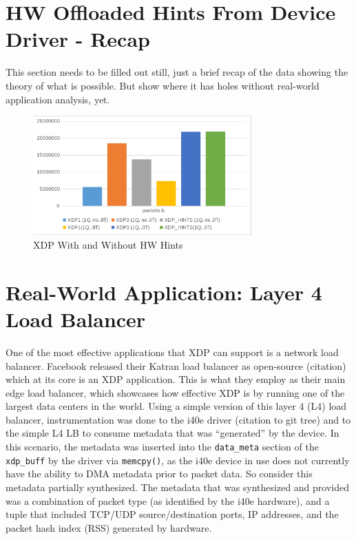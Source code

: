 \documentclass[letterpaper]{article}
\begin{document}
\section{HW Offloaded Hints From Device Driver - Recap} 
This section needs to be filled out still, just a brief recap of the data showing the theory of what is possible.  But show where it has holes without real-world application analysis, yet.

\begin{figure}[h]
\includegraphics[width=3.31in]{xdp-programs-performance.png}
\caption{XDP With and Without HW Hints}
\label{xdp-metadata-layout}
\end{figure}

\section{Real-World Application: Layer 4 Load Balancer}
One of the most effective applications that XDP can support is a network load balancer.  Facebook released their Katran load balancer as open-source (citation) which at its core is an XDP application.  This is what they employ as their main edge load balancer, which showcases how effective XDP is by running one of the largest data centers in the world.
\newline
\newline
Using a simple version of this layer 4 (L4) load balancer, instrumentation was done to the i40e driver (citation to git tree) and to the simple L4 LB to consume metadata that was “generated” by the device.  In this scenario, the metadata was inserted into the {\small \texttt{data\_meta}} section of the {\small \texttt{xdp\_buff}} by the driver via {\small \texttt{memcpy()}}, as the i40e device in use does not currently have the ability to DMA metadata prior to packet data.  So consider this metadata partially synthesized.
\newline
\newline
The metadata that was synthesized and provided was a combination of packet type (as identified by the i40e hardware), and a tuple that included TCP/UDP source/destination ports, IP addresses, and the packet hash index (RSS) generated by hardware.
\end{document}
